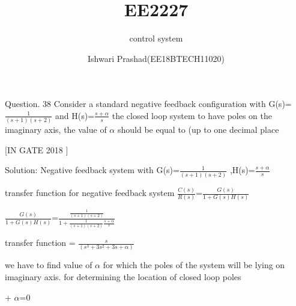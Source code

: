 \documentclass{beamer}
\title[]{EE2227}
\subtitle{control system}
\institute{IIT HYDERABAD}
\author{Ishwari Prashad(EE18BTECH11020)}
\date{}
\begin{document}
\begin{frame}
\titlepage
\end{frame}

\begin{frame}{Question. 38 }
Consider a standard negative feedback configuration with 
G(s)=$\frac{1}{(s+1)(s+2)}$ and H(s)=$\frac{s+\alpha}{s}$
the closed loop system to have poles on the imaginary axis, the value of  $\alpha$ should be equal to (up to one
decimal place





\setlength{\parindent}{8cm}
[IN GATE 2018 ]
\end{frame}



\begin{frame}
Solution: Negative feedback system with G(s)=$\frac{1}{(s+1)(s+2)}$ ,H(s)=$\frac{s+\alpha}{s}$\break


\hspace{1.5cm} transfer function for negative feedback system  $\frac{C(s)}{R(s)}$=$\frac{G(s)}{1+G(s)H(s)}$\break

\hspace{3cm} $\frac{G(s)}{1+G(s)H(s)}$=$\frac{\frac{1}{(s+1)(s+2)}}{1+\frac{1}{(s+1)(s+2)}\frac{s+\alpha}{s}}$ \break

\hspace{3cm} transfer function = $\frac{s}{(s^3 +3s^2+ 3s+ \alpha)}$ \hfill \break
\end{frame}
\begin{frame}
we have to find value of $\alpha$ for which the poles of the system will be lying on imaginary axis.
 for determining the location of closed loop poles \break

 
 
 
 
 
 
 \hspace{3cm}        + $\alpha$=0 \hfill \break

 \end{frame}
\end{document}
